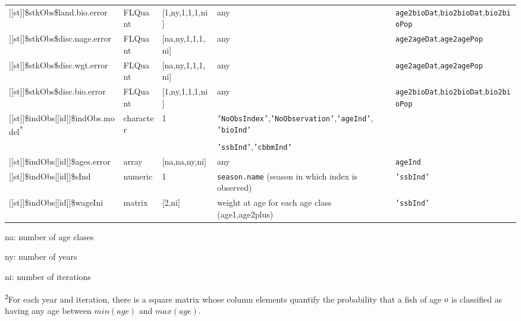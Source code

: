 \begin{landscape}
\begin{table}[!ht]
\begin{footnotesize}
\begin{threeparttable}
\begin{tabular}{lllll}
        {[[st]]}\$stkObs\$land.bio.error & FLQuant & [1,ny,1,1,1,ni] & any & \texttt{age2bioDat},\texttt{bio2bioDat},\texttt{bio2bioPop} \\
        {[[st]]}\$stkObs\$disc.nage.error & FLQuant & [na,ny,1,1,1,ni] & any & \texttt{age2ageDat},\texttt{age2agePop} \\
        {[[st]]}\$stkObs\$disc.wgt.error & FLQuant & [na,ny,1,1,1,ni] & any & \texttt{age2ageDat},\texttt{age2agePop} \\
        {[[st]]}\$stkObs\$disc.bio.error & FLQuant & [1,ny,1,1,1,ni] & any & \texttt{age2bioDat},\texttt{bio2bioDat},\texttt{bio2bioPop} \\
        {[[st]]}\$indObs[[id]]\$indObs.model\textsuperscript{*} & character & 1 & \texttt{'NoObsIndex'},\texttt{'NoObservation'},\texttt{'ageInd'},
          \texttt{'bioInd'} &  \\
         &  &  & \texttt{'ssbInd'},\texttt{'cbbmInd'} &  \\
        {[[st]]}\$indObs[[id]]\$ages.error & array & [na,na,ny,ni] & any & \texttt{ageInd} \\
        {[[st]]}\$indObs[[id]]\$sInd & numeric & 1 & \texttt{season.name} (season in which index is observed) & \texttt{'ssbInd'} \\
        {[[st]]}\$indObs[[id]]\$wageIni & matrix & [2,ni] & weight at age for each age class (age1,age2plus) & \texttt{'ssbInd'} \\
        \hline
      \end{tabular}

      \begin{tablenotes}
        \item na: number of age clases
        \item ny: number of years
        \item ni: number of iterations
        \item \textsuperscript{2}For each year and iteration, there is a square matrix
          whose column elements quantify the probability that a fish of age $a$ is classified as having any age between
          $min(age)$ and $max(age)$.
      \end{tablenotes}

    \end{threeparttable}
  \end{footnotesize}


\end{table}
\end{landscape}
